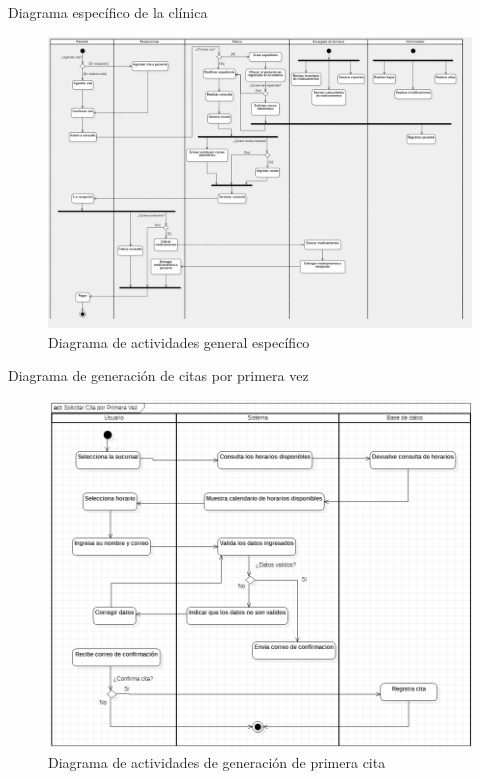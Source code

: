 \documentclass[12pt,letterpaper]{article}
\begin{document}
    \newpage
    Diagrama específico de la clínica
    \begin{figure}[H]
        \centering
        \includegraphics [scale=0.1]{actividades/generalEspecifico4K}
        \caption{Diagrama de actividades general específico}
    \end{figure}

    \newpage
    Diagrama de generación de citas por primera vez
    \begin{figure}[H]
        \centering
        \includegraphics [scale=0.7]{actividades/citaPrimeraVez}
        \caption{Diagrama de actividades de generación de primera cita}
    \end{figure}
\end{document}
